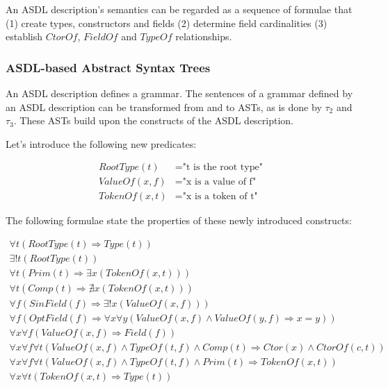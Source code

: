 \noindent
An ASDL description's semantics can be regarded as a sequence of formulae that
(1) create types, constructors and fields (2) determine field cardinalities 
(3) establish \(CtorOf\), \(FieldOf\) and \(TypeOf\) relationships.

\subsubsection{ASDL-based Abstract Syntax Trees}

An ASDL description defines a grammar. The sentences of a grammar defined by
an ASDL description can be transformed from and to ASTs, as is done by
\(\tau_{2}\) and \(\tau_{3}\). These ASTs build upon the constructs of the
ASDL description.

\noindent
Let's introduce the following new predicates:

\begin{align*}
RootType(t)   &= \text{"t is the root type"} \\
ValueOf(x, f) &= \text{"x is a value of f"} \\
TokenOf(x, t) &= \text{"x is a token of t"}
\end{align*}

\noindent
The following formulae state the properties of these newly introduced constructs:

\begingroup
\allowdisplaybreaks
\vspace{-.5cm}
\begin{gather*}
\forall t(RootType(t) \Rightarrow Type(t)) \\
\exists! t(RootType(t)) \\
\forall t(Prim(t) \Rightarrow \exists x(TokenOf(x, t))) \\
\forall t(Comp(t) \Rightarrow \nexists x(TokenOf(x, t))) \\
\forall f(SinField(f) \Rightarrow \exists! x(ValueOf(x, f))) \\
\forall f(OptField(f) \Rightarrow \forall x \forall y(ValueOf(x, f) 
\land ValueOf(y, f) \Rightarrow x = y)) \\
\forall x \forall f(ValueOf(x, f) \Rightarrow Field(f)) \\
\forall x \forall f \forall t(ValueOf(x, f) \land
TypeOf(t, f) \land Comp(t) \Rightarrow Ctor(x) \land CtorOf(c, t)) \\
\forall x \forall f \forall t(ValueOf(x, f) \land TypeOf(t, f)
\land Prim(t) \Rightarrow TokenOf(x, t)) \\
\forall x \forall t(TokenOf(x, t) \Rightarrow Type(t))
\end{gather*}
\endgroup

